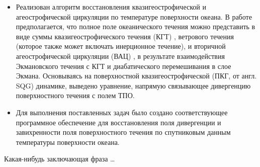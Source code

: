 \begin{itemize}
\item Реализован алгоритм восстановления квазигеострофической и агеострофической циркуляции по температуре поверхности океана. В работе предполагается, что полное поле океанического течения можно представить в виде суммы квазигеострофического течения (КГТ) , ветрового течения  (которое также может включать инерционное течение), и вторичной агеострофической циркуляции (ВАЦ) , в результате взаимодействия Экмановского течения с КГТ и диабатического перемешивания в слое Экмана. Основываясь на поверхностной квазигеострофической (ПКГ, от англ. SQG) динамике, выведено уравнение, напрямую связывающее дивергенцию поверхностного течения с полем ТПО.

\item Для выполнения поставленных задач было создано соответствующее программное обеспечение для восстановления поля дивергенции и завихренности поля поверхностного течения по спутниковым данным температуры поверхности океана.

\end{itemize}

Какая-нибудь заключающая фраза \ldots

\clearpage